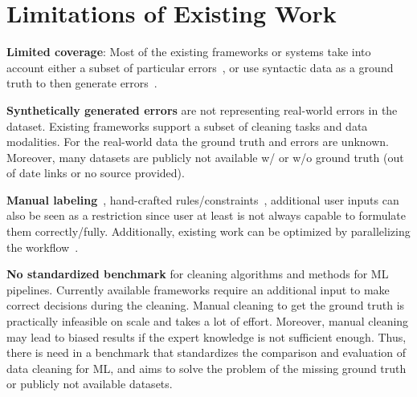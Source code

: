 \newpage

\section{Limitations of Existing Work}
\label{sec:limitations_of_existing_work}

\textbf{Limited coverage}: Most of the existing frameworks or systems take into account either a subset of particular errors~\cite{boostclean, raha, baran, jenga}, or use syntactic data as a ground truth to then generate errors~\cite{RestatGCS2022, bart}.

\textbf{Synthetically generated errors} are not representing real-world errors in the dataset. Existing frameworks support a subset of cleaning tasks and data modalities.
For the real-world data the ground truth and errors are unknown. Moreover, many datasets are publicly not available w/ or w/o ground truth (out of date links or no source provided).

\textbf{Manual labeling}~\cite{raha, baran}, hand-crafted rules/constraints~\cite{bart, RestatGCS2022}, additional user inputs can also be seen as a restriction 
since user at least is not always capable to formulate them correctly/fully. %
Additionally, existing work can be optimized by parallelizing the workflow~\cite{raha, baran, RekatsinasCIR2017, holodetect, RestatGCS2022, jenga}.

\textbf{No standardized benchmark} for cleaning algorithms and methods for ML pipelines. 
Currently available frameworks require an additional input to make correct decisions during the cleaning. Manual cleaning to get the ground truth is practically infeasible on scale and takes a lot of effort.
Moreover, manual cleaning may lead to biased results if the expert knowledge is not sufficient enough.
Thus, there is need in a benchmark that standardizes the comparison and evaluation of data cleaning for ML, and aims to solve the problem of the missing ground truth or publicly not available datasets.
